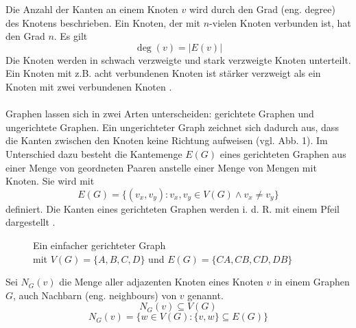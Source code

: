 \noindent Die Anzahl der Kanten an einem Knoten $v$ wird durch den Grad (eng. degree) des Knotens beschrieben. 
Ein Knoten, der mit $n$-vielen Knoten verbunden ist, hat den Grad $n$. Es gilt
$$\deg(v) = |E(v)|$$
Die Knoten werden in schwach verzweigte und stark verzweigte Knoten unterteilt. 
Ein Knoten mit z.B. acht verbundenen Knoten ist stärker verzweigt als ein Knoten mit zwei verbundenen Knoten \parencite[5]{Diestel2017-bj}.\\\\
Graphen lassen sich in zwei Arten unterscheiden: gerichtete Graphen und ungerichtete Graphen. Ein ungerichteter Graph zeichnet sich dadurch aus, dass die Kanten zwischen den Knoten keine Richtung aufweisen (vgl. Abb. 1). Im Unterschied dazu besteht die Kantemenge $E(G)$ eines gerichteten Graphen aus einer Menge von geordneten Paaren anstelle einer Menge von Mengen mit Knoten. Sie wird mit
\begin{equation*}
    E(G) = \{(v_x, v_y) \colon v_x,v_y \in V(G) \wedge v_x \neq v_y\}
\end{equation*}
definiert. Die Kanten eines gerichteten Graphen werden i. d. R. mit einem Pfeil dargestellt \parencite[30]{Diestel2017-bj}.
\begin{figure}[H]
    \centering
    
    \caption[caption]{Ein einfacher gerichteter Graph\\ mit $V(G)=\{A,B,C,D\}$ und $E(G)=\{CA,CB,CD,DB\}$}
\end{figure}
\noindent Sei $N_G(v)$ die Menge aller adjazenten Knoten eines Knoten $v$ in einem Graphen $G$, auch Nachbarn (eng. neighbours) von $v$ genannt. \parencite[5]{Diestel2017-bj}
\begin{equation*}
    N_G(v) \subseteq V(G)
\end{equation*}
\begin{equation*}
    N_G(v)=\{w \in V(G) \colon \{v,w\} \subseteq E(G)  \}
\end{equation*}

